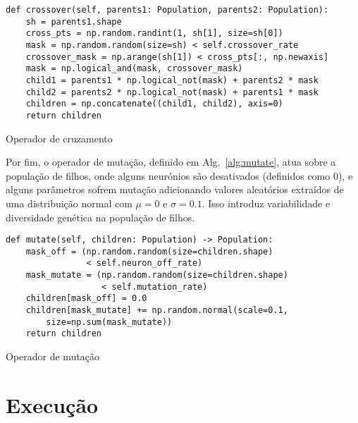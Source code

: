 \begin{listing}[!ht]
\begin{verbatim}
def crossover(self, parents1: Population, parents2: Population):
    sh = parents1.shape
    cross_pts = np.random.randint(1, sh[1], size=sh[0])
    mask = np.random.random(size=sh) < self.crossover_rate
    crossover_mask = np.arange(sh[1]) < cross_pts[:, np.newaxis]
    mask = np.logical_and(mask, crossover_mask)
    child1 = parents1 * np.logical_not(mask) + parents2 * mask
    child2 = parents2 * np.logical_not(mask) + parents1 * mask
    children = np.concatenate((child1, child2), axis=0)
    return children
\end{verbatim}
\caption{Operador de cruzamento}
\label{alg:crossover}
\end{listing}


Por fim, o operador de mutação, definido em Alg.~\ref{alg:mutate}, atua sobre a população de filhos, onde alguns neurónios são desativados (definidos como 0), e alguns parâmetros sofrem mutação adicionando valores aleatórios extraídos de uma distribuição normal com $\mu=0$ e $\sigma=0.1$. Isso introduz variabilidade e diversidade genética na população de filhos.

\begin{listing}[!ht]
\begin{verbatim}
def mutate(self, children: Population) -> Population:
    mask_off = (np.random.random(size=children.shape) 
                < self.neuron_off_rate)
    mask_mutate = (np.random.random(size=children.shape) 
                   < self.mutation_rate)
    children[mask_off] = 0.0
    children[mask_mutate] += np.random.normal(scale=0.1, 
        size=np.sum(mask_mutate))
    return children
\end{verbatim}
\caption{Operador de mutação}
\label{alg:mutate}
\end{listing}


\section{Execução}\label{sec:execution}


